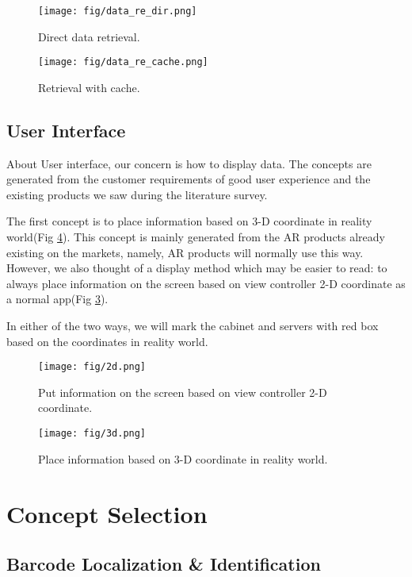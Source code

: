 \documentclass[11pt,a4paper]{article}
\begin{document}
\begin{onehalfspace}
\begin{figure}[H]
    \centering
    \texttt{[image: fig/data\_re\_dir.png]}
    \caption{Direct data retrieval.}
    \label{fig:direct_retrieval}
\end{figure}

\begin{figure}[H]
    \centering
    \texttt{[image: fig/data\_re\_cache.png]}
    \caption{Retrieval with cache.}
    \label{fig:cache}
\end{figure}

\subsection{User Interface}
About User interface, our concern is how to display data. The concepts are generated from the customer requirements of good user experience and the existing products we saw during the literature survey. 

The first concept is to place information based on 3-D coordinate in reality world(Fig \ref{fig:3d}). This concept is mainly generated from the AR products already existing on the markets, namely, AR products will normally use this way. However, we also thought of a display method which may be easier to read: to always place information on the screen based on view controller 2-D coordinate as a normal app(Fig \ref{fig:2d}). 

In either of the two ways, we will mark the cabinet and servers with red box based on the coordinates in reality world.
\begin{figure}[H]
    \centering
    \texttt{[image: fig/2d.png]}
    \caption{Put information on the screen based on view controller 2-D coordinate.}
    \label{fig:2d}
\end{figure}
\begin{figure}[H]
    \centering
    \texttt{[image: fig/3d.png]}
    \caption{Place information based on 3-D coordinate in reality world.}
    \label{fig:3d}
\end{figure}





\section{Concept Selection}
\subsection{Barcode Localization \& Identification}


\end{onehalfspace}
\end{document}
